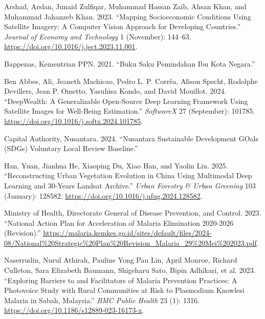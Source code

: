 \documentclass[
  letterpaper,
  DIV=11,
  numbers=noendperiod]{scrreprt}
\newlength{\cslhangindent}
\newlength{\cslentryspacingunit} %
\newenvironment{CSLReferences}[2] %
 {%
  \setlength{\parindent}{0pt}
  \ifodd #1
  \let\oldpar\par
  \def\par{\hangindent=\cslhangindent\oldpar}
  \fi
  \setlength{\parskip}{#2\cslentryspacingunit}
 }%
 {}
\begin{document}
\hypertarget{refs}{}
\begin{CSLReferences}{1}{0}
\leavevmode{}%
Arshad, Arslan, Junaid Zulfiqar, Muhammad Hassan Zaib, Ahsan Khan, and
Muhammad Jahanzeb Khan. 2023. {``Mapping Socioeconomic Conditions Using
Satellite Imagery: A Computer Vision Approach for Developing
Countries.''} \emph{Journal of Economy and Technology} 1 (November):
144--63. \url{https://doi.org/10.1016/j.ject.2023.11.001}.

\leavevmode{}%
Bappenas, Kementrian PPN. 2021. {``Buku Saku Pemindahan Ibu Kota
Negara.''}

\leavevmode{}%
Ben Abbes, Ali, Jeaneth Machicao, Pedro L. P. Corrêa, Alison Specht,
Rodolphe Devillers, Jean P. Ometto, Yasuhisa Kondo, and David Mouillot.
2024. {``DeepWealth: A Generalizable Open-Source Deep Learning Framework
Using Satellite Images for Well-Being Estimation.''} \emph{SoftwareX} 27
(September): 101785. \url{https://doi.org/10.1016/j.softx.2024.101785}.

\leavevmode{}%
Capital Authority, Nusantara. 2024. {``Nusantara Sustainable Development
GOals (SDGs) Voluntary Local Review Baseline.''}

\leavevmode{}%
Han, Yuan, Jianhua He, Xiaoping Du, Xiao Han, and Yaolin Liu. 2025.
{``Reconstructing Urban Vegetation Evolution in China Using Multimodal
Deep Learning and 30-Years Landsat Archive.''} \emph{Urban Forestry \&
Urban Greening} 103 (January): 128582.
\url{https://doi.org/10.1016/j.ufug.2024.128582}.

\leavevmode{}%
Ministry of Health, Directorate General of Disease Prevention, and
Control. 2023. {``National Action Plan for Acceleration of Malaria
Elimination 2020-2026 (Revision).''}
\url{https://malaria.kemkes.go.id/sites/default/files/2024-08/National\%20Strategic\%20Plan\%20Revision_Malaria_29\%20Mei\%202023.pdf}.

\leavevmode{}%
Naserrudin, Nurul Athirah, Pauline Yong Pau Lin, April Monroe, Richard
Culleton, Sara Elizabeth Baumann, Shigeharu Sato, Bipin Adhikari, et al.
2023. {``Exploring Barriers to and Facilitators of Malaria Prevention
Practices: A Photovoice Study with Rural Communities at Risk to
Plasmodium Knowlesi Malaria in Sabah, Malaysia.''} \emph{BMC Public
Health} 23 (1): 1316. \url{https://doi.org/10.1186/s12889-023-16173-x}.


\end{CSLReferences}
\end{document}
